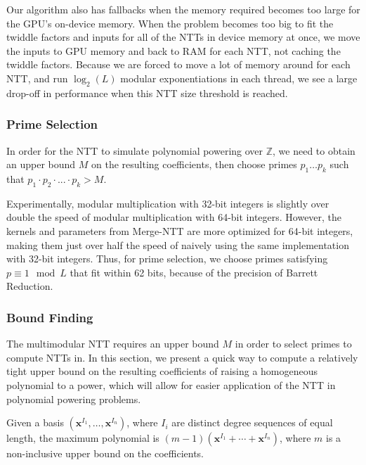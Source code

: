 Our algorithm also has fallbacks when the memory required becomes too large for the 
GPU's on-device memory.
When the problem becomes too big to fit the twiddle factors and 
inputs for all of the NTTs in device memory at once, 
we move the inputs to GPU memory and 
back to RAM for each NTT, not caching the twiddle factors. 
Because we are forced to move a lot of memory around for each NTT, 
and run $\log_2(L)$ modular exponentiations in each thread,
we see a large drop-off in 
performance when this NTT size threshold is reached. 


\subsubsection{Prime Selection}
In order for the NTT to simulate polynomial powering over $\mathbb{Z}$, 
we need to obtain an upper bound $M$ 
on the resulting coefficients, then 
choose primes $p_1 \dots p_k$ such 
that $p_1 \cdot p_2 \cdot ... \cdot p_k > M$.

Experimentally, modular multiplication with 32-bit integers 
is slightly over double the speed of modular 
multiplication with 64-bit integers. 
However, the kernels and parameters from Merge-NTT are more 
optimized for 64-bit integers, making them just over half the
speed of naively using the same implementation with 32-bit 
integers. Thus, for prime selection, 
we choose primes satisfying $p \equiv 1 \mod L$ that fit 
within 62 bits, because of the precision of Barrett Reduction.

\subsubsection{Bound Finding}
The multimodular NTT requires an upper bound $M$ in order to select primes 
to compute NTTs in. In this section, we present a quick way to compute a 
relatively tight upper bound on the resulting 
coefficients of raising a homogeneous polynomial to a power, which
will allow for easier application of the NTT in polynomial powering
problems.

\begin{defn}
    Given a basis $(\mathbf{x}^{I_1}, \dots, \mathbf{x}^{I_n})$, where $I_i$ are distinct degree sequences of equal length, the maximum polynomial is $(m - 1)(\mathbf{x}^{I_1} + \cdots + \mathbf{x}^{I_n})$, where $m$ is a non-inclusive upper bound on the coefficients.
\end{defn}

